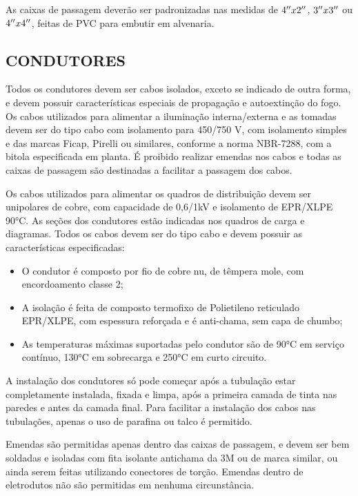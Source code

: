 As caixas de passagem deverão ser padronizadas nas medidas de $4{}^{\prime\prime} x 2 {}^{\prime\prime}$, $3 {}^{\prime\prime} x 3 {}^{\prime\prime}$ ou $4 {}^{\prime\prime} x 4 {}^{\prime\prime}$, feitas de PVC para embutir em alvenaria.

\subsection{CONDUTORES}

Todos os condutores devem ser cabos isolados, exceto se indicado de outra forma, e devem possuir características especiais de propagação e autoextinção do fogo. Os cabos utilizados para alimentar a iluminação interna/externa e as tomadas devem ser do tipo cabo com isolamento para 450/750 V, com isolamento simples e das marcas Ficap, Pirelli ou similares, conforme a norma NBR-7288, com a bitola especificada em planta. É proibido realizar emendas nos cabos e todas as caixas de passagem são destinadas a facilitar a passagem dos cabos.

Os cabos utilizados para alimentar os quadros de distribuição devem ser unipolares de cobre, com capacidade de 0,6/1kV e isolamento de EPR/XLPE 90°C. As seções dos condutores estão indicadas nos quadros de carga e diagramas. Todos os cabos devem ser do tipo cabo e devem possuir as características especificadas:

\begin{itemize}
	\item O condutor é composto por fio de cobre nu, de têmpera mole, com encordoamento classe 2;
	\item  A isolação é feita de composto termofixo de Polietileno reticulado EPR/XLPE, com espessura reforçada e é anti-chama, sem capa de chumbo;
	\item As temperaturas máximas suportadas pelo condutor são de 90°C em serviço contínuo, 130°C em sobrecarga e 250°C em curto circuito.
\end{itemize}

A instalação dos condutores só pode começar após a tubulação estar completamente instalada, fixada e limpa, após a primeira camada de tinta nas paredes e antes da camada final. Para facilitar a instalação dos cabos nas tubulações, apenas o uso de parafina ou talco é permitido.

Emendas são permitidas apenas dentro das caixas de passagem, e devem ser bem soldadas e isoladas com fita isolante antichama da 3M ou de marca similar, ou ainda serem feitas utilizando conectores de torção. Emendas dentro de eletrodutos não são permitidas em nenhuma circunstância.

